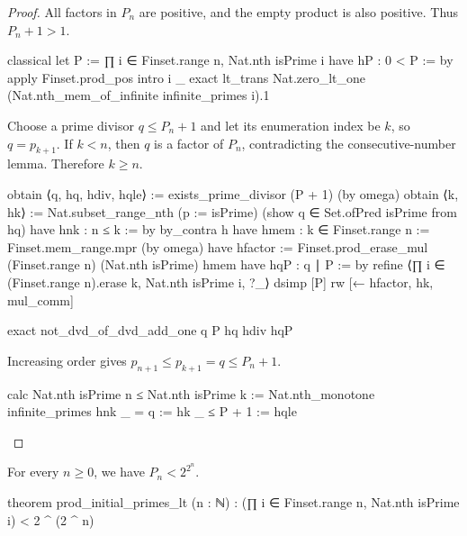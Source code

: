 \begin{proof}
  All factors in $P_n$ are positive, and the empty product is also positive.
  Thus $P_n+1>1$.

  \begin{lean}
    classical
    let P := ∏ i ∈ Finset.range n, Nat.nth isPrime i
    have hP : 0 < P := by
      apply Finset.prod_pos
      intro i _
      exact lt_trans Nat.zero_lt_one (Nat.nth_mem_of_infinite infinite_primes i).1
  \end{lean}

  Choose a prime divisor $q\le P_n+1$ and let its enumeration index be $k$, so $q=p_{k+1}$.
  If $k<n$, then $q$ is a factor of $P_n$, contradicting the consecutive-number lemma.
  Therefore $k\ge n$.

  \begin{lean}
    obtain ⟨q, hq, hdiv, hqle⟩ := exists_prime_divisor (P + 1) (by omega)
    obtain ⟨k, hk⟩ := Nat.subset_range_nth (p := isPrime) (show q ∈ Set.ofPred isPrime from hq)
    have hnk : n ≤ k := by
      by_contra h
      have hmem : k ∈ Finset.range n := Finset.mem_range.mpr (by omega)
      have hfactor := Finset.prod_erase_mul (Finset.range n) (Nat.nth isPrime) hmem
      have hqP : q ∣ P := by
        refine ⟨∏ i ∈ (Finset.range n).erase k, Nat.nth isPrime i, ?_⟩
        dsimp [P]
        rw [← hfactor, hk, mul_comm]

      exact not_dvd_of_dvd_add_one q P hq hdiv hqP
  \end{lean}

  Increasing order gives $p_{n+1}\le p_{k+1}=q\le P_n+1$.

  \begin{lean}
    calc
      Nat.nth isPrime n ≤ Nat.nth isPrime k := Nat.nth_monotone infinite_primes hnk
      _ = q := hk
      _ ≤ P + 1 := hqle
  \end{lean}

\end{proof}

\begin{lemma}
  \label{ent:lem:prime-product-double-exponential}
  For every $n\ge0$, we have $P_n<2^{2^n}$.

  \begin{lean}
    theorem prod_initial_primes_lt (n : ℕ) :
        (∏ i ∈ Finset.range n, Nat.nth isPrime i) < 2 ^ (2 ^ n)
  \end{lean}
\end{lemma}

